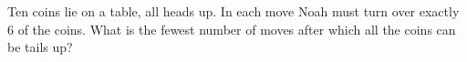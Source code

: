 Ten coins lie on a table, all heads up. In each move Noah must turn over exactly $6$ of the coins. What is the fewest number of moves after which all the coins can be tails up?

